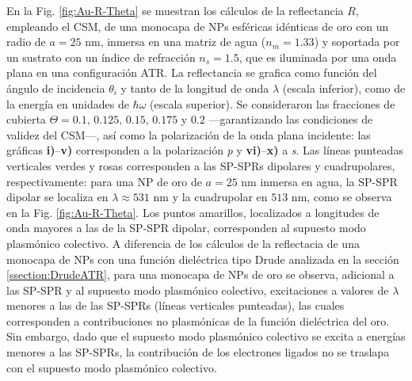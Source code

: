 En la Fig.  \ref{fig:Au-R-Theta} se muestran los cálculos de la reflectancia $R$, empleando el CSM, de una monocapa de NPs esféricas idénticas de oro con un radio de $a = 25$ nm, inmersa en una matriz de agua ($n_m = 1.33$) y soportada por un sustrato con un índice de refracción $n_s = 1.5$, que es iluminada por una onda plana en una configuración ATR. La reflectancia se grafica como función del ángulo de incidencia $\theta_i$ y tanto de la longitud de onda $\lambda$ (escala inferior), como de la energía en unidades de $\hbar\omega$ (escala superior). Se consideraron las fracciones de cubierta $\Theta = 0.1,\,0.125,\,0.15,\, 0.175$ y $0.2$ ---garantizando las condiciones de validez del CSM---, así como la polarización de la onda plana incidente: las gráficas \textbf{i)}--\textbf{v)} corresponden a la polarización \emph{p} y \textbf{vi)}--\textbf{x)} a \emph{s}. Las líneas punteadas verticales verdes y rosas corresponden a las SP-SPRs dipolares y cuadrupolares, respectivamente: para una NP de oro de $a= 25$ nm inmersa en agua, la SP-SPR dipolar se localiza en $\lambda \approx 531$ nm y la cuadrupolar en $513$ nm, como se observa en la Fig. \ref{fig:Au-R-Theta}. Los puntos amarillos, localizados a longitudes de onda mayores a las de la SP-SPR dipolar, corresponden al supuesto modo plasmónico colectivo. A diferencia de los cálculos de la reflectacia de una monocapa de NPs  con una función dieléctrica tipo Drude analizada en la sección \ref{ssection:DrudeATR}, para una monocapa de NPs de oro se observa, adicional a las SP-SPR y al supuesto modo plasmónico colectivo, excitaciones a valores de $\lambda$ menores a las de las SP-SPRs (líneas verticales punteadas), las cuales corresponden a contribuciones no plasmónicas de la función dieléctrica del oro. Sin embargo, dado que el supuesto modo plasmónico colectivo se excita a energías menores a las  SP-SPRs, la contribución de los electrones ligados no se traslapa con el supuesto modo plasmónico colectivo. 

